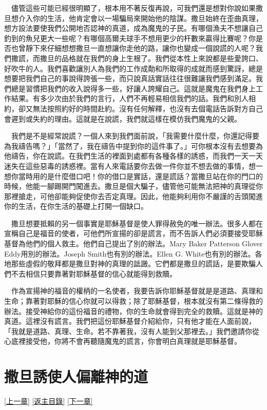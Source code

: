 \documentclass{book}
\begin{document}
　儘管這些可能已經很明顯了，根本用不著反復再說，可我們還是想對你說如果撒旦想介入你的生活，他肯定會以一場騙局來開始他的陰謀。撒旦始終在歪曲真理，想方設法要使我們公開地否認神的真道，成為魔鬼的子民。有哪個漁夫不想讓自己釣到的魚兒更大一些呢？有哪個高爾夫球手不想用更少的杆數來贏得比賽呢？你是否也曾靜下來仔細想想撒旦一直想讓你走他的路，讓你也變成一個說謊的人呢？我們撒謊，而撒旦的品格就在我們的身上生根了。我們從本性上來說都是些愛誇口、好吹牛的人。我們喜歡讓別人為我們的工作成勣和所取得的成就而感到驚訝，總是想要把我們自己的事說得誇張一些，而只說真話實話往往很難讓我們感到滿足。我們總是習慣把我們的收入說得多一些，好讓人誇耀自己。這就是魔鬼在我們身上工作結果。有多少次由於我們的言行，人們不再輕易相信我們的話。我們和別人相約，卻又無法按照約好的時間赴約。沒有任何解釋，也沒有去個電話告訴對方自己會遲到或失約的理由。這就是在說謊，我們就這樣在模仿我們魔鬼的父親。

　我們是不是經常說謊？一個人來到我們面前說，「我需要什麼什麼，你還記得要為我禱告嗎？」「當然了，我在禱告中提到你的這件事了。」可你根本沒有去想要為他禱告，你在說謊。在我們生活的裡面到處都有各種各樣的誘惑，而我們一天一天迷失在這些惡毒的誘惑裡。當有人來電話要你去做一件你並不想去做的事情，想一想你當時用的是什麼借口吧！你的借口是實話，還是謊話？當撒旦站在你的門口的時候，他能一腳踢開門闖進去。撒旦是個大騙子，儘管他可能無法把神的真理從你那裡搶走，可他卻能夠促使你去否定真理。因此，他能夠利用你不嚴謹的舌頭闖進你的生活，在你生活的基礎上打開一個缺口。

　撒旦想要抵賴的另一個事實是耶穌基督是使人罪得赦免的唯一辦法。很多人都在宣稱自己是福音的使者，可他們所宣揚的卻是謊言，而不告訴人們必須要接受耶穌基督為他們的個人救主。他們自己提出了別的辦法。Mary Baker Patterson Glover Eddy用別的辦法。Joseph Smith也有別的辦法。Ellen G. White也有別的辦法。各地那些虛假的敬拜都是撒旦對神的真理的詆譭。它們都是撒旦的謊話，是要欺騙人們不去相信只要靠著對耶穌基督的信心就能得到救贖。

　作為宣揚神的福音的權柄的一名使者，我要告訴你耶穌基督就是是道路、真理和生命；靠著對耶穌的信心你就可以得救；除了耶穌基督，根本就沒有第二條得救的辦法。接受神給你的這份福音的禮物，你的生命就會得到完全的救贖。這就是神的真道。這裡沒有謊言。我們把這份耶穌基督介紹給你，只有他才能在人面前說，「我就是道路、真理、生命。若不靠著我，沒有人能到父那裡去。」我們邀請你從心底裡接受他，你將不會再聽隨魔鬼的謊言，你會明白真理就是耶穌基督。

\chapter{撒旦誘使人偏離神的道}
\label{sec:ch06}
\hyperref[sec:ch05]{[上一章]}
\hyperlink{toc}{[返主目錄]}
\hyperref[sec:ch07]{[下一章]}
\end{document}
